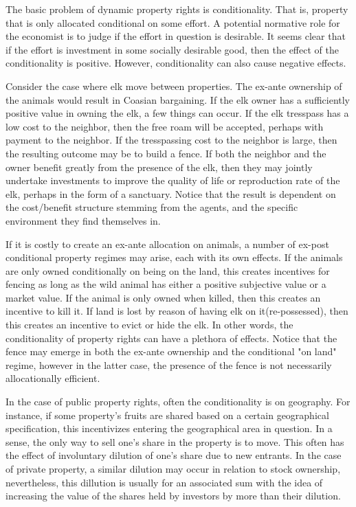The basic problem of dynamic property rights is conditionality. That is, property that is only allocated conditional on some effort. A potential normative role for the economist is to judge if the effort in question is desirable. It seems clear that if the effort is investment in some socially desirable good, then the effect of the conditionality is positive. However, conditionality can also cause negative effects. 

Consider the case where elk move between properties. The ex-ante ownership of the animals would result in Coasian bargaining. If the elk owner has a sufficiently positive value in owning the elk, a few things can occur. If the elk tresspass has a low cost to the neighbor, then the free roam will be accepted, perhaps with payment to the neighbor. If the tresspassing cost to the neighbor is large, then the resulting outcome may be to build a fence. If both the neighbor and the owner benefit greatly from the presence of the elk, then they may jointly undertake investments to improve the quality of life or reproduction rate of the elk, perhaps in the form of a sanctuary. Notice that the result is dependent on the cost/benefit structure stemming from the agents, and the specific environment they find themselves in. 

If it is costly to create an ex-ante allocation on animals, a number of ex-post conditional property regimes may arise, each with its own effects. If the animals are only owned conditionally on being on the land, this creates incentives for fencing as long as the wild animal has either a positive subjective value or a market value. If the animal is only owned when killed, then this creates an incentive to kill it. If land is lost by reason of having elk on it(re-possessed), then this creates an incentive to evict or hide the elk. In other words, the conditionality of property rights can have a plethora of effects. Notice that the fence may emerge in both the ex-ante ownership and the conditional "on land" regime, however in the latter case, the presence of the fence is not necessarily allocationally efficient. 


In the case of public property rights, often the conditionality is on geography. For instance, if some property's fruits are shared based on a certain geographical specification, this incentivizes entering the geographical area in question. In a sense, the only way to sell one's share in the property is to move. This often has the effect of involuntary dilution of one's share due to new entrants. In the case of private property, a similar dilution may occur in relation to stock ownership, nevertheless, this dillution is usually for an associated sum with the idea of increasing the value of the shares held by investors by more than their dilution.

